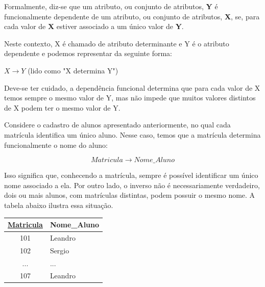 Formalmente, diz-se que um atributo, ou conjunto de atributos, \textbf{Y} é funcionalmente dependente de um atributo, ou conjunto de atributos, \textbf{X}, se, para cada valor de \textbf{X} estiver associado a um único valor de \textbf{Y}.\cite{date2003introducao}

Neste contexto, X é chamado de atributo determinante e Y é o atributo dependente e podemos representar da seguinte forma:

\begin{center}
$X \rightarrow Y$
\vskip 0.2cm
(lido como "X determina Y")
\end{center}

Deve-se ter cuidado, a dependência funcional determina que para cada valor de X temos sempre o mesmo valor de Y, mas não impede que muitos valores distintos de X podem ter o mesmo valor de Y.

\begin{tcolorbox}[breakable,colback=blue!5,colframe=blue!40!black,title=Situação exemplo]

    Considere o cadastro de alunos apresentado anteriormente, no qual cada matrícula identifica um único aluno. Nesse caso, temos que a matrícula determina funcionalmente o nome do aluno:

    \[
    Matricula \rightarrow Nome\_Aluno
    \]

    Isso significa que, conhecendo a matrícula, sempre é possível identificar um único nome associado a ela. Por outro lado, o inverso não é necessariamente verdadeiro, dois ou mais alunos, com matrículas distintas, podem possuir o mesmo nome. A tabela abaixo ilustra essa situação.

    \vspace{0.4cm}

    \centering
    \renewcommand{\arraystretch}{1.2}

    \begin{tabular}{|c|l|}
    \hline
    \textbf{\underline{Matricula}} & \textbf{Nome\_Aluno} \\ \hline
    101 & Leandro \\ \hline
    102 & Sergio \\ \hline
    ... & ... \\ \hline
    107 & Leandro \\ \hline
    
    \end{tabular}

    \vspace{0.3cm}
\end{tcolorbox}

